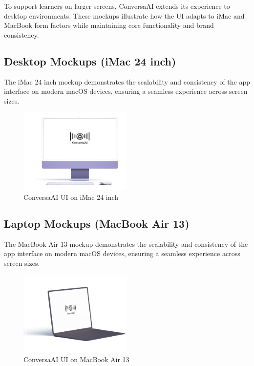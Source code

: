 \documentclass[12pt]{article}
\begin{document}
To support learners on larger screens, ConversaAI extends its experience to desktop environments. These mockups illustrate how the UI adapts to iMac and MacBook form factors while maintaining core functionality and brand consistency.


\subsection*{Desktop Mockups (iMac 24 inch)}

The iMac 24 inch mockup demonstrates the scalability and consistency of the app interface on modern macOS devices, ensuring a seamless experience across screen sizes.

\begin{figure}[h!]
    \centering
    \includegraphics[width=0.5\textwidth]{iMac_24_inch.png} %
    \caption{ConversaAI UI on iMac 24 inch}
    \label{fig:iMac_ui}
\end{figure}

\subsection*{Laptop Mockups (MacBook Air 13)}

The MacBook Air 13 mockup demonstrates the scalability and consistency of the app interface on modern macOS devices, ensuring a seamless experience across screen sizes.

\begin{figure}[h!]
    \centering
    \includegraphics[width=0.5\textwidth]{MacBook_Air_13.png} %
    \caption{ConversaAI UI on MacBook Air 13}
    \label{fig:macbook_ui}
\end{figure}
\end{document}
